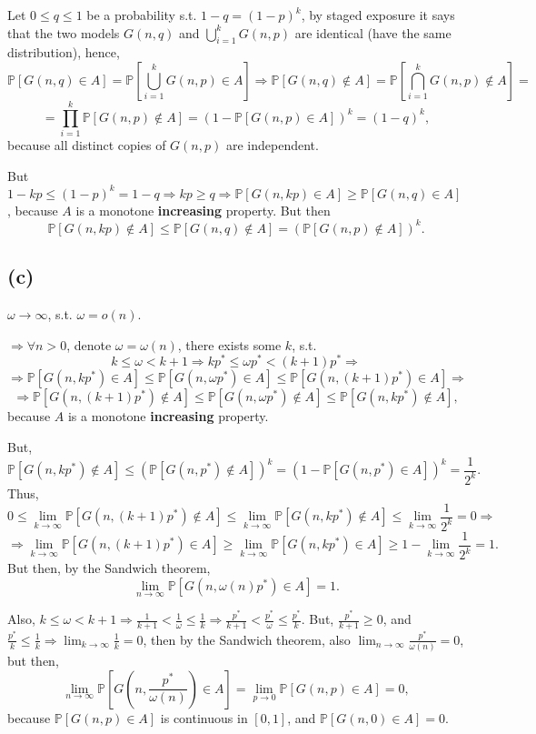 \documentclass{article}
\begin{document}
Let $0\leq{q}\leq{1}$ be a probability s.t. $1-q=(1-p)^k$, by staged exposure it says that the two models $G(n,q)$ and $\bigcup_{i=1}^kG(n,p)$ are identical (have the same distribution), hence,
\[\mathbb{P}[G(n,q)\in{A}]=\mathbb{P}[\bigcup_{i=1}^kG(n,p)\in{A}]\Rightarrow\mathbb{P}[G(n,q)\notin{A}]=\mathbb{P}[\bigcap_{i=1}^kG(n,p)\notin{A}]=\]\[=\prod_{i=1}^k\mathbb{P}[G(n,p)\notin{A}]=(1-\mathbb{P}[G(n,p)\in{A}])^k=(1-q)^k,\]
because all distinct copies of $G(n,p)$ are independent.

But $1-kp\leq(1-p)^k=1-q\Rightarrow{kp\geq{q}}\Rightarrow\mathbb{P}[G(n,kp)\in{A}]\geq\mathbb{P}[G(n,q)\in{A}]$, because $A$ is a monotone \textbf{increasing} property. But then 
\[\mathbb{P}[G(n,kp)\notin{A}]\leq\mathbb{P}[G(n,q)\notin{A}]=(\mathbb{P}[G(n,p)\notin{A}])^k.\]
\subsection*{(c)}
$\omega\rightarrow\infty$, s.t. $\omega=o(n)$.

$\Rightarrow\forall{n>0}$, denote $\omega=\omega(n)$, there exists some $k$, s.t. 
\[k\leq\omega<k+1\Rightarrow{k}p^\ast\leq\omega{p^\ast}<(k+1)p^\ast\Rightarrow\]\[\Rightarrow\mathbb{P}[G(n,kp^\ast)\in{A}]\leq\mathbb{P}[G(n,\omega{p^\ast})\in{A}]\leq\mathbb{P}[G(n,(k+1)p^\ast)\in{A}]\Rightarrow\]\[\Rightarrow\mathbb{P}[G(n,(k+1)p^\ast)\notin{A}]\leq\mathbb{P}[G(n,\omega{p^\ast})\notin{A}]\leq\mathbb{P}[G(n,kp^\ast)\notin{A}],\] because $A$ is a monotone \textbf{increasing} property.

But, 
\[\mathbb{P}[G(n,kp^\ast)\notin{A}]\leq(\mathbb{P}[G(n,p^\ast)\notin{A}])^k=(1-\mathbb{P}[G(n,p^\ast)\in{A}])^k=\frac{1}{2^k}.\]
Thus, 
\[0\leq\lim_{k\rightarrow\infty}\mathbb{P}[G(n,(k+1)p^\ast)\notin{A}]\leq\lim_{k\rightarrow\infty}\mathbb{P}[G(n,kp^\ast)\notin{A}]\leq\lim_{k\rightarrow\infty}\frac{1}{2^k}=0\Rightarrow\]\[\Rightarrow\lim_{k\rightarrow\infty}\mathbb{P}[G(n,(k+1)p^\ast)\in{A}]\geq\lim_{k\rightarrow\infty}\mathbb{P}[G(n,kp^\ast)\in{A}]\geq{1}-\lim_{k\rightarrow\infty}\frac{1}{2^k}=1.\]
But then, by the Sandwich theorem, 
\[\lim_{n\rightarrow\infty}\mathbb{P}[G(n,\omega(n)p^\ast)\in{A}]=1.\]

Also, $k\leq\omega<k+1\Rightarrow\frac{1}{k+1}<\frac{1}{\omega}\leq\frac{1}{k}\Rightarrow\frac{p^\ast}{k+1}<\frac{p^\ast}{\omega}\leq\frac{p^\ast}{k}$.
But,
$\frac{p^\ast}{k+1}\geq{0}$, and $\frac{p^\ast}{k}\leq\frac{1}{k}\Rightarrow\lim_{k\rightarrow\infty}\frac{1}{k}=0$, then by the Sandwich theorem, also $\lim_{n\rightarrow\infty}\frac{p^\ast}{\omega(n)}=0$, but then,
\[\lim_{n\rightarrow\infty}\mathbb{P}[G(n,\frac{p^\ast}{\omega(n)})\in{A}]=\lim_{p\rightarrow{0}}\mathbb{P}[G(n,p)\in{A}]=0,\]
because $\mathbb{P}[G(n,p)\in{A}]$ is continuous in $[0,1]$, and $\mathbb{P}[G(n,0)\in{A}]=0$.
\end{document}
